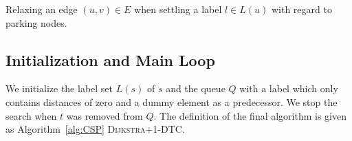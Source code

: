 \begin{algorithm}[htbp]
	\DontPrintSemicolon



	\caption{\label{alg:relax_edge}Relaxing an edge $(u,v) \in E$ when settling a label $l \in L(u)$ with regard to parking nodes.}
\end{algorithm}

\subsection{Initialization and Main Loop}
We initialize the label set $L(s)$ of $s$ and the queue $Q$ with a label which only contains distances of zero and a dummy element as a predecessor. We stop the search when $t$ was removed from $Q$. The definition of the final algorithm is given as Algorithm~\ref{alg:CSP} \textsc{Dijkstra+1-DTC}.

